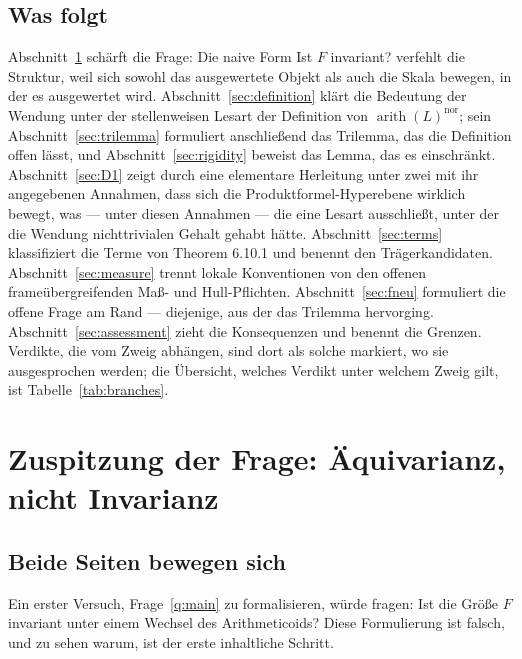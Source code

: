 \documentclass[11pt,a4paper]{article}
\theoremstyle{definition}
\theoremstyle{plain}
\theoremstyle{definition}
\newcommand{\arith}{\operatorname{arith}}
\begin{document}
\subsection{Was folgt}

Abschnitt~\ref{sec:equivariance} schärft die Frage: Die naive Form \glqq Ist $F$
invariant?\grqq{} verfehlt die Struktur, weil sich sowohl das ausgewertete Objekt
als auch die Skala bewegen, in der es ausgewertet wird.
Abschnitt~\ref{sec:definition} klärt die Bedeutung der Wendung unter der
stellenweisen Lesart der Definition von $\arith(L)^{\mathrm{nor}}$; sein
Abschnitt~\ref{sec:trilemma}
formuliert anschließend das Trilemma, das die Definition offen lässt, und
Abschnitt~\ref{sec:rigidity} beweist das Lemma, das es einschränkt.
Abschnitt~\ref{sec:D1} zeigt durch eine
elementare Herleitung unter zwei mit ihr angegebenen Annahmen, dass sich die
Produktformel-Hyperebene wirklich bewegt, was --- unter diesen Annahmen ---
die eine Lesart ausschließt, unter der die Wendung nichttrivialen Gehalt gehabt
hätte. Abschnitt~\ref{sec:terms} klassifiziert die Terme von Theorem 6.10.1 und
benennt den Trägerkandidaten. Abschnitt~\ref{sec:measure} trennt lokale Konventionen
von den offenen frameübergreifenden Maß- und Hull-Pflichten. Abschnitt~\ref{sec:fneu} formuliert die
offene Frage am Rand --- diejenige, aus der das Trilemma hervorging.
Abschnitt~\ref{sec:assessment} zieht die Konsequenzen und benennt die Grenzen.
Verdikte, die vom Zweig abhängen, sind dort als solche markiert, wo sie
ausgesprochen werden; die Übersicht, welches Verdikt unter welchem Zweig gilt, ist
Tabelle~\ref{tab:branches}.

\section{Zuspitzung der Frage: Äquivarianz, nicht Invarianz}
\label{sec:equivariance}

\subsection{Beide Seiten bewegen sich}

Ein erster Versuch, Frage~\ref{q:main} zu formalisieren, würde fragen: Ist die
Größe $F$ invariant unter einem Wechsel des Arithmeticoids? Diese Formulierung ist
falsch, und zu sehen warum, ist der erste inhaltliche Schritt.
\end{document}
